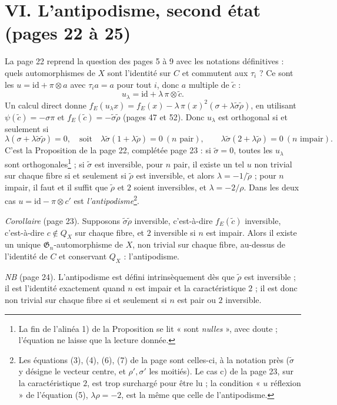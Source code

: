 \documentclass[11pt,a4paper]{article}
\begin{document}
\section*{VI. L'antipodisme, second état (pages 22 à 25)}

La page 22 reprend la question des pages 5 à 9 avec les notations définitives :
quels automorphismes de $X$ sont l'identité sur $C$ et commutent aux
$\tau_i$ ? Ce sont les $u = \mathrm{id} + \pi \otimes a$ avec $\tau_i a = a$
pour tout $i$, donc $a$ multiple de $\tilde c$ :
\[
u_\lambda = \mathrm{id} + \lambda\, \pi \otimes \tilde c .
\]
Un calcul direct donne $f_E(u_\lambda x) = f_E(x) - \lambda\,\pi(x)^2(\sigma +
\lambda\tilde\sigma\tilde\rho)$, en utilisant $\psi(\tilde c) = -\sigma\pi$ et
$f_E(\tilde c) = -\tilde\sigma\tilde\rho$ (pages 47 et 52). Donc $u_\lambda$ est
orthogonal si et seulement si
\[
\lambda(\sigma + \lambda\tilde\sigma\tilde\rho) = 0, \quad \text{soit} \quad
\lambda\tilde\sigma(1 + \lambda\tilde\rho) = 0 \ (n \text{ pair}), \qquad
\lambda\tilde\sigma(2 + \lambda\tilde\rho) = 0 \ (n \text{ impair}).
\]
C'est la Proposition de la page 22, complétée page 23 : si $\tilde\sigma = 0$,
toutes les $u_\lambda$ sont orthogonales\footnote{La fin de l'alinéa 1) de la
Proposition se lit « sont \emph{nulles} », avec doute ; l'équation ne laisse que
la lecture donnée.} ; si $\tilde\sigma$ est inversible,
pour $n$ pair, il existe un tel $u$
non trivial sur chaque fibre si et seulement si $\tilde\rho$ est inversible, et
alors $\lambda = -1/\tilde\rho$ ; pour $n$ impair, il faut et il suffit que
$\tilde\rho$ et $2$ soient inversibles, et $\lambda = -2/\rho$. Dans les deux
cas $u = \mathrm{id} - \pi \otimes c'$ est \emph{l'antipodisme}\footnote{Les
équations (3), (4), (6), (7) de la page sont celles-ci, à la notation près
($\tilde\sigma$ y désigne le vecteur centre, et $\rho', \sigma'$ les moitiés).
Le cas c) de la page 23, sur la caractéristique $2$, est trop surchargé pour
être lu ; la condition « $u$ réflexion » de l'équation (5), $\lambda\rho = -2$,
est la même que celle de l'antipodisme.}.

\emph{Corollaire} (page 23). Supposons $\tilde\sigma\tilde\rho$ inversible,
c'est-à-dire $f_E(\tilde c)$ inversible, c'est-à-dire $c \notin Q_X$ sur
chaque fibre, et $2$ inversible si $n$ est impair. Alors il existe un unique
$\mathfrak{G}_n$-automorphisme de $X$, non trivial sur chaque fibre, au-dessus
de l'identité de $C$ et conservant $Q_X$ : l'antipodisme.

\emph{NB} (page 24). L'antipodisme est défini intrinsèquement dès que
$\tilde\rho$ est inversible ; il est l'identité exactement quand $n$ est impair
et la caractéristique $2$ ; il est donc non trivial sur chaque fibre si et
seulement si $n$ est pair ou $2$ inversible.
\end{document}
